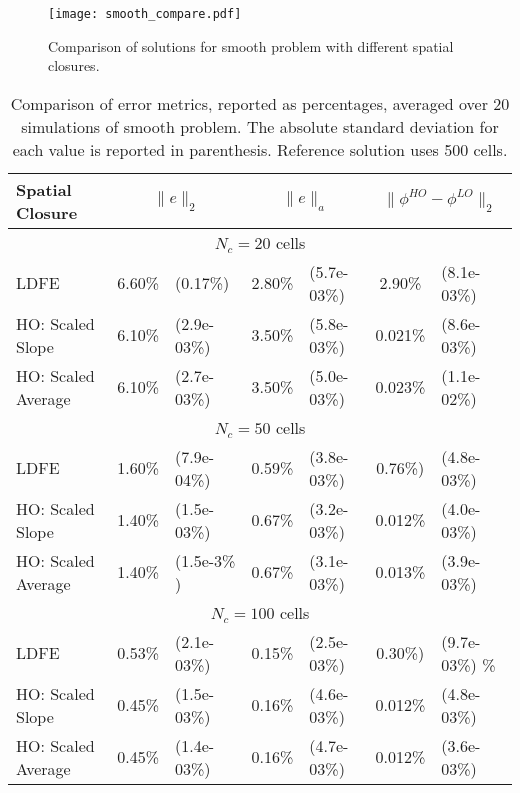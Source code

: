 \begin{figure}[H]
    \centering
    \texttt{[image: smooth\_compare.pdf]}
    \caption{\label{fig:smooth_compare} Comparison of solutions for smooth problem with different spatial closures.}
\end{figure}

\begin{table}[H]
    \caption{\label{tab:smooth} Comparison of error metrics, reported as percentages, averaged over 20 simulations of smooth problem.  The absolute
standard deviation for each value is reported in parenthesis. Reference solution uses 500 cells.}
    \begin{tabular}{|l|cl|cl|cl|} \hline
        Spatial Closure & \multicolumn{2}{|c|}{$\|e\|_2$}  & \multicolumn{2}{|c|}{$\|e\|_{a}$} & \multicolumn{2}{|c|}{$\|\phi^{HO}
        -\phi^{LO}\|_{2}$} \\  \hline \hline
        \multicolumn{7}{|c|}{$N_c = 20$ cells} \\ \hline
LDFE               &   6.60\%  &   (0.17\%)  &   2.80\%     &   (5.7e-03\%)  &   2.90\%   &  (8.1e-03\%)  \\
HO: Scaled Slope   &   6.10\%  &   (2.9e-03\%)  &   3.50\%  &   (5.8e-03\%)  &   0.021\%  &  (8.6e-03\%)  \\
HO: Scaled Average &   6.10\%  &   (2.7e-03\%)  &   3.50\%  &   (5.0e-03\%)  &   0.023\%  &  (1.1e-02\%)  \\ \hline
       \multicolumn{7}{|c|}{$N_c  = 50$ cells}   \\ \hline
LDFE               &   1.60\%  &   (7.9e-04\%)  &   0.59\%  &   (3.8e-03\%)  &   0.76\%)  &  (4.8e-03\%)  \\
HO: Scaled Slope   &   1.40\%  &   (1.5e-03\%)  &   0.67\%  &   (3.2e-03\%)  &   0.012\%  &  (4.0e-03\%)  \\
HO: Scaled Average &   1.40\%  &   (1.5e-3\% ) &   0.67\%   &   (3.1e-03\%)  &   0.013\%  &  (3.9e-03\%)  \\ \hline
       \multicolumn{7}{|c|}{$N_c  = 100$ cells}   \\ \hline
LDFE               &   0.53\%  &   (2.1e-03\%)  &   0.15\%  &   (2.5e-03\%)  &   0.30\%)  &  (9.7e-03\%)  \%\\
HO: Scaled Slope   &   0.45\%  &   (1.5e-03\%)  &   0.16\%  &   (4.6e-03\%)  &   0.012\%  &  (4.8e-03\%)  \\
HO: Scaled Average &   0.45\%  &   (1.4e-03\%)  &   0.16\%  &   (4.7e-03\%)  &   0.012\%  &  (3.6e-03\%)  \\ \hline
    \end{tabular}
\end{table}



